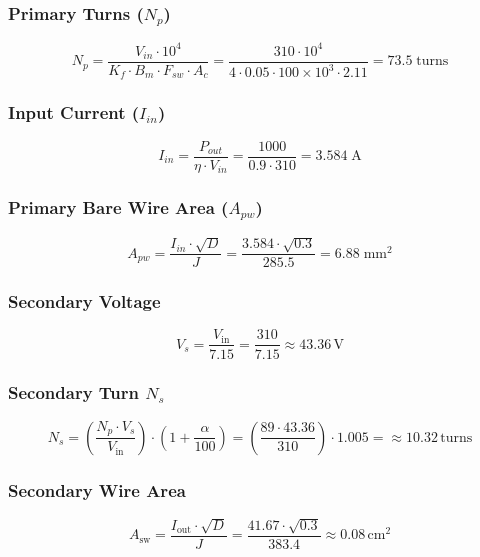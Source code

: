 \subsubsection*{Primary Turns (\(N_p\))}
\begin{equation}
N_p = \frac{V_{in} \cdot 10^4}{K_f \cdot B_m \cdot F_{sw} \cdot A_c} 
    = \frac{310 \cdot 10^4}{4 \cdot 0.05 \cdot 100 \times 10^3 \cdot 2.11} 
    = \boxed{73.5\;\text{turns}}
\end{equation}

\subsubsection*{Input Current (\(I_{in}\))}
\begin{equation}
I_{in} = \frac{P_{out}}{\eta \cdot V_{in}} 
       = \frac{1000}{0.9 \cdot 310} 
       = \boxed{3.584\;\text{A}}
\end{equation}

\subsubsection*{Primary Bare Wire Area (\(A_{pw}\))}
\begin{equation}
A_{pw} = \frac{I_{in} \cdot \sqrt{D}}{J} 
       = \frac{3.584 \cdot \sqrt{0.3}}{285.5} 
       = \boxed{6.88\;\text{mm}^2}
\end{equation}

\subsubsection*{Secondary Voltage}
\begin{equation}
    V_s = \frac{V_{\text{in}}}{7.15} = \frac{310}{7.15} \approx \boxed{43.36\,\text{V}}
\end{equation}

\subsubsection*{Secondary  Turn \( N_s\)}
\begin{equation}
    N_s = \left( \frac{N_p \cdot V_s}{V_{\text{in}}} \right) \cdot \left( 1 + \frac{\alpha}{100} \right) = \left( \frac{89 \cdot 43.36}{310} \right) \cdot 1.005 = \approx \boxed{10.32\,\text{turns}}
\end{equation}

\subsubsection*{Secondary Wire Area}
\begin{equation}
A_{\text{sw}} = \frac{I_{\text{out}} \cdot \sqrt{D}}{J} 
= \frac{41.67 \cdot \sqrt{0.3}}{383.4}
\approx \boxed{0.08\,\text{cm}^2}
\end{equation}
